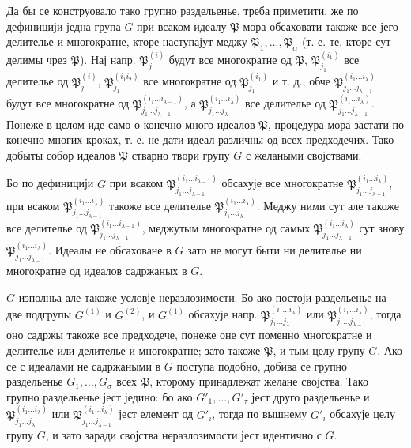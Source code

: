 ﻿\documentclass[11pt]{article}
\newcommand{\ideal}[1]{\mathfrak{#1}}
\begin{document}
Да бы се конструовало тако групно раздельенье, треба приметити, же по дефиницији једна група \(G\) при всаком идеалу \(\ideal P\) мора обсаховати такоже все јего делителье и многократне, кторе наступајут меджу \(\ideal P_1,\ldots,\ideal P_\alpha\) (т. е. те, кторе сут делимы чрез \(\ideal P\)). Нај напр. \(\ideal P_j^{(i)}\) будут все многократне од \(\ideal P\), \(\ideal P_{j_1}^{(i_1)}\) все делителье од \(\ideal P_j^{(i)}\), \(\ideal P_{j_1}^{(i_1 i_2)}\) все многократне од \(\ideal P_{j_1}^{(i_1)}\) и т. д.; обче \(\ideal P_{j_1\ldots j_{\lambda-1}}^{(i_1\ldots i_\lambda)}\) будут все многократне од \(\ideal P_{j_1\ldots j_{\lambda-1}}^{(i_1\ldots i_{\lambda-1})}\), а \(\ideal P_{j_1\ldots j_\lambda}^{(i_1\ldots i_\lambda)}\) все делителье од \(\ideal P_{j_1\ldots j_{\lambda-1}}^{(i_1\ldots i_\lambda)}\). Понеже в целом иде само о конечно много идеалов \(\ideal P\), процедура мора застати по конечно многих кроках, т. е. не дати идеал различны од всех предходечих. Тако добыты собор идеалов \(\ideal P\) стварно твори групу \(G\) с желаными својствами.

Бо по дефиницији \(G\) при всаком \(\ideal P_{j_1\ldots j_{\lambda-1}}^{(i_1\ldots i_{\lambda-1})}\) обсахује все многократне \(\ideal P_{j_1\ldots j_{\lambda-1}}^{(i_1\ldots i_\lambda)}\), при всаком \(\ideal P_{j_1\ldots j_{\lambda-1}}^{(i_1\ldots i_\lambda)}\) такоже все делителье \(\ideal P_{j_1\ldots j_\lambda}^{(i_1\ldots i_\lambda)}\). Меджу ними сут але такоже все делителье од \(\ideal P_{j_1\ldots j_{\lambda-1}}^{(i_1\ldots i_{\lambda-1})}\), меджутым многократне од самых \(\ideal P_{j_1\ldots j_{\lambda-1}}^{(i_1\ldots i_\lambda)}\) сут знову \(\ideal P_{j_1\ldots j_{\lambda-1}}^{(i_1\ldots i_\lambda)}\). Идеалы не обсаховане в \(G\) зато не могут быти ни делителье ни многократне од идеалов садржаных в \(G\).

\(G\) изполньа але такоже условје неразлозимости. Бо ако постоји раздельенье на две подгрупы \(G^{(1)}\) и \(G^{(2)}\), и \(G^{(1)}\) обсахује напр. \(\ideal P_{j_1\ldots j_\lambda}^{(i_1\ldots i_\lambda)}\) или \(\ideal P_{j_1\ldots j_{\lambda-1}}^{(i_1\ldots i_\lambda)}\), тогда оно садржы такоже все предходече, понеже оне сут поменно многократне и делителье или делителье и многократне; зато такоже \(\ideal P\), и тым целу групу \(G\). Ако се с идеалами не садржаными в \(G\) поступа подобно, добива се групно раздельенье \(G_1,\ldots,G_\sigma\) всех \(\ideal P\), кторому принадлежат желане својства. Тако групно раздельенье јест једино: бо ако \(G'_1,\ldots,G'_\tau\) јест друго раздельенье и \(\ideal P_{j_1\ldots j_\lambda}^{(i_1\ldots i_\lambda)}\) или \(\ideal P_{j_1\ldots j_{\lambda-1}}^{(i_1\ldots i_\lambda)}\) јест елемент од \(G'_i\), тогда по вышнему \(G'_i\) обсахује целу групу \(G\), и зато заради својства неразлозимости јест идентично с \(G\).
\end{document}
